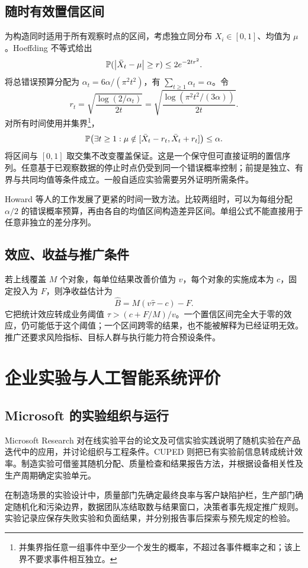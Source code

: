 \subsection{随时有效置信区间}
为构造同时适用于所有观察时点的区间，考虑独立同分布 \(X_i\in[0,1]\)、均值为 \(\mu\)。Hoeffding 不等式给出
\[
\mathbb P(\left\lvert \bar X_t-\mu\right\rvert\ge r)\le2e^{-2tr^2}.
\]
将总错误预算分配为 \(\alpha_t=6\alpha/(\pi^2t^2)\)，有 \(\sum_{t\ge1}\alpha_t=\alpha\)。令
\[
r_t=\sqrt{\frac{\log(2/\alpha_t)}{2t}}
=\sqrt{\frac{\log(\pi^2t^2/(3\alpha))}{2t}}.
\]
对所有时间使用并集界\footnote{并集界指任意一组事件中至少一个发生的概率，不超过各事件概率之和；该上界不要求事件相互独立。}，
\[
\mathbb P\!\left(\exists t\ge1:
\mu\notin[\bar X_t-r_t,\bar X_t+r_t]\right)\le\alpha.
\]
将区间与 \([0,1]\) 取交集不改变覆盖保证。这是一个保守但可直接证明的置信序列。任意基于已观察数据的停止时点仍受到同一个错误概率控制；前提是独立、有界与共同均值等条件成立。一般自适应实验需要另外证明所需条件。

Howard 等人的工作发展了更紧的时间一致方法\cite{cs06}。比较两组时，可以为每组分配 \(\alpha/2\) 的错误概率预算，再由各自的均值区间构造差异区间。单组公式不能直接用于任意非独立的差分序列。

\subsection{效应、收益与推广条件}
若上线覆盖 \(M\) 个对象，每单位结果改善价值为 \(v\)，每个对象的实施成本为 \(c\)，固定投入为 \(F\)，则净收益估计为
\[
\widehat B=M(v\hat\tau-c)-F.
\]
它把统计效应转成业务阈值 \(\tau>(c+F/M)/v\)。一个置信区间完全大于零的效应，仍可能低于这个阈值；一个区间跨零的结果，也不能被解释为已经证明无效。推广还要求风险指标、目标人群与执行能力符合预设条件。

\section{企业实验与人工智能系统评价}

\subsection{Microsoft 的实验组织与运行}
Microsoft Research 对在线实验平台的论文及可信实验实践说明了随机实验在产品迭代中的应用，并讨论组织与工程条件\cite{ms06}。CUPED 则把已有实验前信息转成统计效率。制造实验可借鉴其随机分配、质量检查和结果报告方法，并根据设备相关性及生产周期确定实验单元。

在制造场景的实验设计中，质量部门先确定最终良率与客户缺陷护栏，生产部门确定随机化和污染边界，数据团队冻结取数与结果窗口，决策者事先规定推广规则。实验记录应保存失败实验和负面结果，并分别报告事后探索与预先规定的检验。


